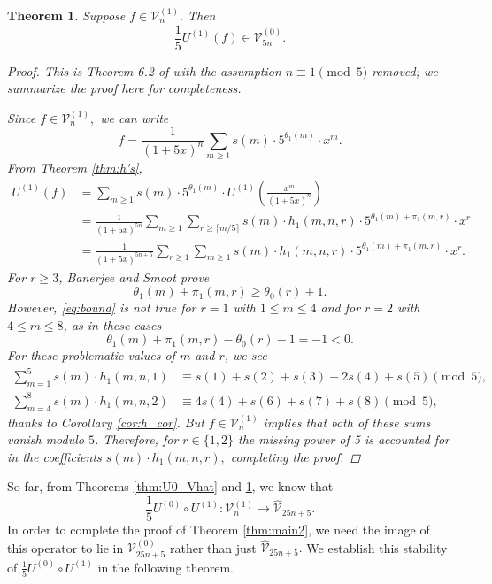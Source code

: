 \documentclass[12pt, reqno]{amsart}
\newtheorem{thm}{Theorem}[section]
\theoremstyle{definition}
\theoremstyle{remark}
\begin{document}
\begin{thm}\label{thm:U1_V}
Suppose $f \in \mathcal{V}_n^{(1)}.$ Then
\[\frac{1}{5} U^{(1)}(f) \in \mathcal{V}_{5n}^{(0)}.\]
\begin{proof}
This is Theorem 6.2 of \cite{BS} with the assumption $n \equiv 1 \pmod{5}$ removed; we summarize the proof here for completeness. 

Since $f \in \mathcal{V}_n^{(1)},$ we can write 
\[f = \frac{1}{(1+5x)^n} \sum\limits_{m \geq 1} s(m) \cdot 5^{\theta_1(m)} \cdot x^m.\]
From Theorem \ref{thm:h's},
\begin{align*}
U^{(1)}(f) &= \sum\limits_{m \geq 1} s(m) \cdot 5^{\theta_1(m)} \cdot U^{(1)} \left( \frac{x^m}{(1+5x)^n}\right) \\
&= \frac{1}{(1+5x)^{5n}} \sum\limits_{m \geq 1} \sum\limits_{r \geq \lceil m/5 \rceil} s(m) \cdot h_1(m,n,r) \cdot 5^{\theta_1(m) + \pi_1(m,r)} \cdot x^r \\
&= \frac{1}{(1+5x)^{5n+5}} \sum\limits_{r \geq 1} \sum\limits_{m \geq 1}  s(m) \cdot h_1(m,n,r) \cdot 5^{\theta_1(m) + \pi_1(m,r)} \cdot x^r.
\end{align*}
For $r \geq 3$, Banerjee and Smoot prove
\begin{equation}\label{eq:bound}
\theta_1(m)+\pi_1(m,r) \geq \theta_0(r)+1.
\end{equation}
However, \eqref{eq:bound} is not true for $r=1$ with $1 \leq m \leq 4$ and for $r=2$ with $4 \leq m \leq 8$, as in these cases 
\[\theta_1(m)+\pi_1(m,r) - \theta_0(r) -1 = -1 < 0.\]
For these problematic values of $m$ and $r$, we see
\begin{align*} 
\sum\limits_{m=1}^5 s(m) \cdot h_1(m,n,1) &\equiv s(1) + s(2) + s(3) + 2s(4) + s(5) \pmod{5}, \\
\sum\limits_{m=4}^8 s(m) \cdot h_1(m,n,2) &\equiv 4s(4) + s(6) + s(7) + s(8) \pmod{5},
\end{align*}
thanks to Corollary \ref{cor:h_cor}. But $f \in \mathcal{V}_n^{(1)}$ implies that both of these sums vanish modulo $5$. Therefore, for $r \in \{1,2\}$ the missing power of 5 is accounted for in the coefficients $s(m) \cdot h_1(m,n,r),$ completing the proof.
\end{proof}
\end{thm}

So far, from Theorems \ref{thm:U0_Vhat} and \ref{thm:U1_V}, we know that 
\[\frac{1}{5} U^{(0)} \circ U^{(1)} : \mathcal{V}_n^{(1)} \rightarrow \hat{\mathcal{V}}_{25n+5}.\]
In order to complete the proof of Theorem \ref{thm:main2}, we need the image of this operator to lie in $\mathcal{V}_{25n+5}^{(0)}$ rather than just $\hat{\mathcal{V}}_{25n+5}.$ We establish this stability of $\frac{1}{5} U^{(0)} \circ U^{(1)}$ in the following theorem. 
\end{document}
